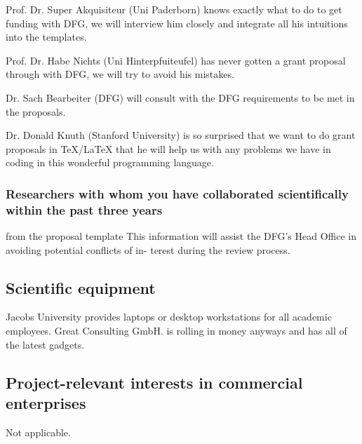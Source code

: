 \begin{compactdesc}
\item[Prof. Dr. Super Akquisiteur (Uni Paderborn)] knows exactly what to do to get funding
  with DFG, we will interview him closely and integrate all his intuitions into the
  {\pn} templates.
\item[Prof. Dr. Habe Nichts (Uni Hinterpfuiteufel)] has never gotten a grant proposal
  through with DFG, we will try to avoid his mistakes.
\item[Dr. Sach Bearbeiter (DFG)] will consult with the DFG requirements to be met in the
  proposals.
\item[Dr. Donald Knuth (Stanford University)] is so surprised that we want to do grant
  proposals in {\TeX/\LaTeX} that he will help us with any problems we have in coding in
  this wonderful programming language.
\end{compactdesc}

\subsubsection{Researchers with whom you have collaborated scientifically within the past three years }


\begin{todo}{from the proposal template}
This information will assist the DFG’s Head Office in avoiding potential conflicts of in-
terest during the review process.
\end{todo}


\subsection{Scientific equipment }

Jacobs University provides laptops or desktop workstations for all academic
employees. Great Consulting GmbH. is rolling in money anyways and has all of the latest
gadgets.


\subsection{Project-relevant interests in commercial enterprises }

Not applicable.


